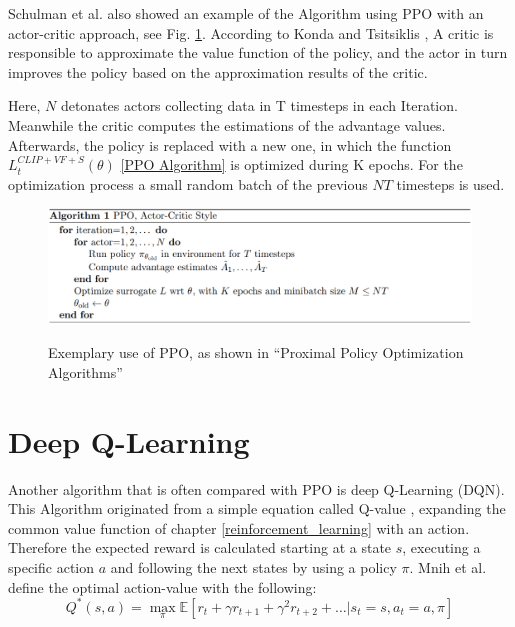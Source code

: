Schulman et al. also showed an example of the Algorithm using PPO with an actor-critic approach, see Fig. \ref{fig:ppo_algo_code}. According to Konda and Tsitsiklis \cite{kots03}, A critic is responsible to approximate the value function of the policy, and the actor in turn improves the policy based on the approximation results of the critic.

Here, $N$ detonates actors collecting data in T timesteps in each Iteration. Meanwhile the critic computes the estimations of the advantage values. Afterwards, the policy is replaced with a new one, in which the function $L_{t}^{CLIP+VF+S}(\theta)$ \eqref{PPO Algorithm} is optimized during K epochs. For the optimization process a small random batch of the previous $NT$ timesteps is used.
\begin{figure}[hpbt]
    \centering
    \includegraphics[width=1\textwidth]{pictures/ppo_algo_code.png}\\
    \caption[Exemplary Use Of PPO]{Exemplary use of PPO, as shown in ``Proximal Policy Optimization Algorithms''\cite{scwo17}}\label{fig:ppo_algo_code}
\end{figure}

\section{Deep Q-Learning}
Another algorithm that is often compared with PPO is deep Q-Learning (DQN). This Algorithm originated from a simple equation called Q-value \cite{jaja19}, expanding the common value function of chapter \ref{reinforcement_learning} with an action. Therefore the expected reward is calculated starting at a state $s$, executing a specific action $a$ and following the next states by using a policy $\pi$. Mnih et al. \cite{mnka13} define the optimal action-value with the following:
\begin{equation}\label{qvalue}
    Q^*(s,a) = \max_{\pi} \mathbb{E}\left[ r_{t} + \gamma r_{t+1} + \gamma^2 r_{t+2} + \ldots | s_t = s, a_t = a, \pi \right]
\end{equation}

